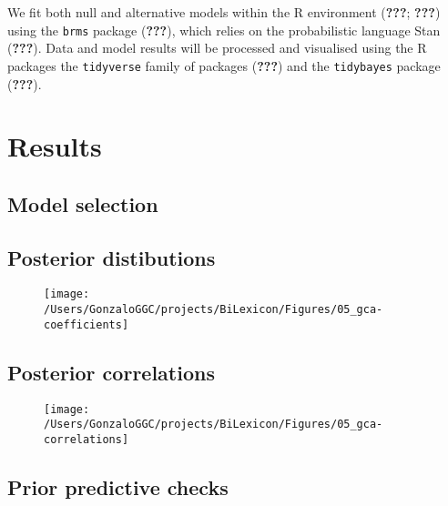 \documentclass[english,man,man,floatsintext]{apa6}
\begin{document}
We fit both null and alternative models within the R environment ({\textbf{???}}; {\textbf{???}}) using the \texttt{brms} package ({\textbf{???}}), which relies on the probabilistic language Stan ({\textbf{???}}). Data and model results will be processed and visualised using the R packages the \texttt{tidyverse} family of packages ({\textbf{???}}) and the \texttt{tidybayes} package ({\textbf{???}}).

\hypertarget{results}{%
\section{Results}\label{results}}

\hypertarget{model-selection}{%
\subsection{Model selection}\label{model-selection}}

\hypertarget{posterior-distibutions}{%
\subsection{Posterior distibutions}\label{posterior-distibutions}}

\begin{figure}

{\centering \texttt{[image: /Users/GonzaloGGC/projects/BiLexicon/Figures/05\_gca-coefficients]} 

}

\caption{ }\label{fig:posteriors}
\end{figure}

\hypertarget{posterior-correlations}{%
\subsection{Posterior correlations}\label{posterior-correlations}}

\begin{figure}

{\centering \texttt{[image: /Users/GonzaloGGC/projects/BiLexicon/Figures/05\_gca-correlations]} 

}

\caption{ }\label{fig:correlations}
\end{figure}

\hypertarget{prior-predictive-checks}{%
\subsection{Prior predictive checks}\label{prior-predictive-checks}}
\end{document}
